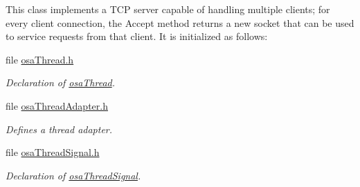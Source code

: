 \begin{DoxyCompactItemize}
\begin{DoxyCompactList}
This class implements a T\+C\+P server capable of handling multiple clients; for every client connection, the Accept method returns a new socket that can be used to service requests from that client. It is initialized as follows\+: \end{DoxyCompactList}\item 
file \hyperlink{osa_thread_8h}{osa\+Thread.\+h}
\begin{DoxyCompactList}\small\item\em Declaration of \hyperlink{classosa_thread}{osa\+Thread}. \end{DoxyCompactList}\item 
file \hyperlink{osa_thread_adapter_8h}{osa\+Thread\+Adapter.\+h}
\begin{DoxyCompactList}\small\item\em Defines a thread adapter. \end{DoxyCompactList}\item 
file \hyperlink{osa_thread_signal_8h}{osa\+Thread\+Signal.\+h}
\begin{DoxyCompactList}\small\item\em Declaration of \hyperlink{classosa_thread_signal}{osa\+Thread\+Signal}. \end{DoxyCompactList}\end{DoxyCompactItemize}
